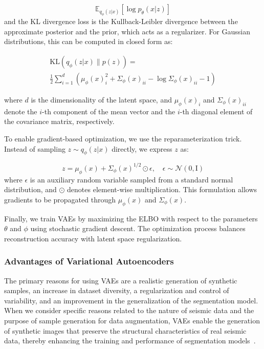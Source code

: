 \documentclass{ieeeaccess}
\begin{document}
\begin{equation}
\mathbb{E}_{q_\phi(z | x)} \left[ \log p_\theta(x | z) \right]
\end{equation}
and the KL divergence loss is the Kullback-Leibler divergence between the approximate posterior and the prior, which acts as a regularizer. For Gaussian distributions, this can be computed in closed form as:

\begin{equation}
\begin{aligned}
\text{KL}(q_\phi(z | x) \parallel p(z))
=  \\
\frac{1}{2} \sum_{i=1}^{d} \left( \mu_\phi(x)_i^2 + \Sigma_\phi(x)_{ii} - \log \Sigma_\phi(x)_{ii} - 1 \right)
\end{aligned}
\end{equation}

where $d$ is the dimensionality of the latent space, and $\mu_\phi(x)_i$ and $\Sigma_\phi(x)_{ii}$ denote the $i$-th component of the mean vector and the $i$-th diagonal element of the covariance matrix, respectively.

To enable gradient-based optimization, we use the reparameterization trick. Instead of sampling $z \sim q_\phi(z | x)$ directly, we express $z$ as:

\begin{equation}
z = \mu_\phi(x) + \Sigma_\phi(x)^{1/2} \odot \epsilon, \quad \epsilon \sim \mathcal{N}(0, \mathrm{I})
\end{equation}
where $\epsilon$ is an auxiliary random variable sampled from a standard normal distribution, and $\odot$ denotes element-wise multiplication. This formulation allows gradients to be propagated through $\mu_\phi(x)$ and $\Sigma_\phi(x)$.

Finally, we train VAEs by maximizing the ELBO with respect to the parameters $\theta$ and $\phi$ using stochastic gradient descent. The optimization process balances reconstruction accuracy with latent space regularization.

\subsubsection{Advantages of Variational Autoencoders}
The primary reasons for using VAEs are a realistic generation of synthetic samples, an increase in dataset diversity, a regularization and control of variability, and an improvement in the generalization of the segmentation model. When we consider specific reasons related to the nature of seismic data and the purpose of sample generation for data augmentation, VAEs enable the generation of synthetic images that preserve the structural characteristics of real seismic data, thereby enhancing the training and performance of segmentation models~\cite{Henriques2021,Wang2021,Anjom2024}.
\end{document}
